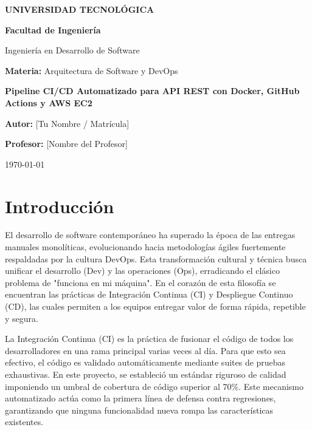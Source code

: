 \documentclass[12pt, a4paper]{article}
\begin{document}
\begin{titlepage}
    \centering
    \vspace*{2cm}
    {\Huge \bfseries UNIVERSIDAD TECNOLÓGICA \par}
    \vspace{1cm}
    {\Large \bfseries Facultad de Ingeniería \par}
    \vspace{0.5cm}
    {\large Ingeniería en Desarrollo de Software \par}
    \vspace{2cm}
    {\large \textbf{Materia:} Arquitectura de Software y DevOps \par}
    \vspace{2cm}
    {\LARGE \bfseries Pipeline CI/CD Automatizado para API REST con Docker, GitHub Actions y AWS EC2 \par}
    \vspace{3cm}
    {\large \textbf{Autor:} [Tu Nombre / Matrícula] \par}
    \vspace{0.5cm}
    {\large \textbf{Profesor:} [Nombre del Profesor] \par}
    \vfill
    {\large \today \par}
\end{titlepage}

\newpage
\justifying
\tableofcontents
\newpage

\section{Introducción}
El desarrollo de software contemporáneo ha superado la época de las entregas manuales monolíticas, evolucionando hacia metodologías ágiles fuertemente respaldadas por la cultura DevOps. Esta transformación cultural y técnica busca unificar el desarrollo (Dev) y las operaciones (Ops), erradicando el clásico problema de "funciona en mi máquina". En el corazón de esta filosofía se encuentran las prácticas de Integración Continua (CI) y Despliegue Continuo (CD), las cuales permiten a los equipos entregar valor de forma rápida, repetible y segura. 

La Integración Continua (CI) es la práctica de fusionar el código de todos los desarrolladores en una rama principal varias veces al día. Para que esto sea efectivo, el código es validado automáticamente mediante suites de pruebas exhaustivas. En este proyecto, se estableció un estándar riguroso de calidad imponiendo un umbral de cobertura de código superior al 70\%. Este mecanismo automatizado actúa como la primera línea de defensa contra regresiones, garantizando que ninguna funcionalidad nueva rompa las características existentes.
\end{document}
